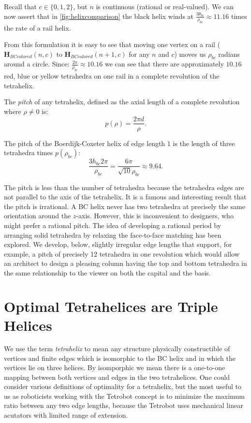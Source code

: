 \documentclass[twocolumn,10pt]{asme2ej}
\renewcommand{\vec}[1]{\mathbf{#1}}
\begin{document}
Recall that $c \in \{0,1,2\}$, but $n$ is continuous (rational or real-valued).
We can now assert that in \cref{fig:helixcomparison} the black helix winds at
$\frac{3 \theta_{bc}}{\rho_{bc}} \approx 11.16 $ times the rate of a rail helix.

From this formulation it is easy to see that moving one vertex on a rail
($\vec{H}_{BCcolored}(n,c)$ to $\vec{H}_{BCcolored}(n+1,c)$ for any $n$ and $c$)
moves us $\rho_{bc}$ radians around a circle. Since:
$ \frac{2 \pi}{\rho_{bc}} \approx 10.16 $
we can see that there are approximately $10.16$ red, blue or yellow tetrahedra on one rail in a
complete revolution of the tetrahelix.

The \emph{pitch} of any tetrahelix, defined as the axial length of a complete revolution
where $\rho \neq 0$ is:
\begin{equation}
  \label{pitcheqn}
p(\rho) = \frac{2 \pi  d}{\rho} \text{.}
\end{equation}

The pitch of the Boerdijk-Coxeter helix of edge length $1$ is the length of three tetrahedra times
$p(\rho_{bc})$:
\begin{equation}
   \frac{3 h_{bc}  2 \pi }{\rho_{bc}} 
   = \frac{6 \pi}{\sqrt{10}\rho_{bc}}
   \approx 9.64
 \text{.}
\end{equation}


The pitch is less than the number of tetrahedra because the tetrahedra
edges are not parallel to the axis of the tetrahelix.  It is a famous and interesting result
that the pitch is irrational. A BC helix never has two tetrahedra at
precisely the same orientation around the $z$-axis. However, this is
inconvenient to designers, who might prefer a rational pitch.
The idea of developing a rational period by arranging solid tetrahedra by relaxing
the face-to-face matching
has been explored\cite{sadler2013periodic}. 
We develop, below, slightly irregular edge lengths that support, for example,
a pitch of precisely 12
tetrahedra in one revolution which would allow an architect to
design a pleasing column having the top and bottom tetrahedra in the same relationship to the
viewer on both the capital and the basis.


\section{Optimal Tetrahelices are Triple Helices}

We use the term \emph{tetrahelix} to mean any structure physically constructible of
vertices and finite edges which is isomorphic to the BC helix and in which the
vertices lie on three helices.
By isomporphic we mean there is a one-to-one mapping between both
vertices and edges in the two tetrahelices.
One could consider various definitions of optimality for a
tetrahelix, but the most useful to us as roboticists working with the Tetrobot
concept is to minimize the
maximum ratio between any two edge lengths, because the Tetrobot uses
mechanical linear acutators with
limited range of extension.
\end{document}
